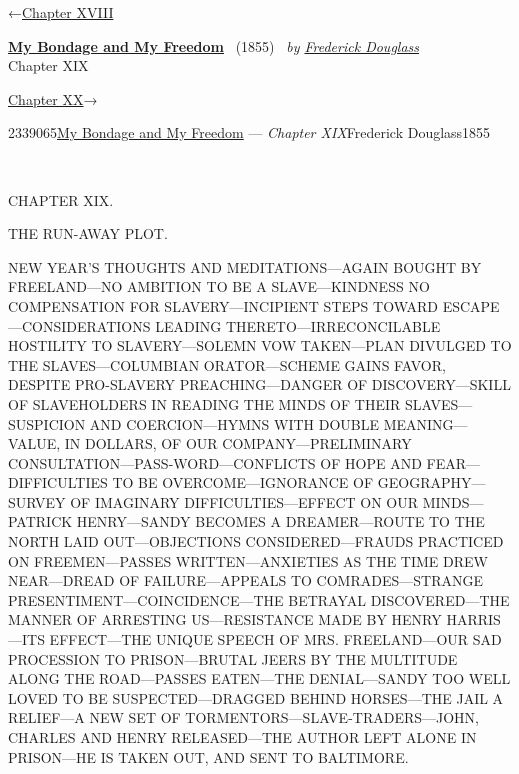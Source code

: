 \hypertarget{headerContainer}{}
\hypertarget{navigationHeader}{}
\protect\hypertarget{headerprevious}{}{←\href{/wiki/My_Bondage_and_My_Freedom_(1855)/Chapter_XVIII}{Chapter
XVIII}}

\textbf{\protect\hypertarget{header_title_text}{}{\href{/wiki/My_Bondage_and_My_Freedom_(1855)}{My
Bondage and My Freedom}}} ~(1855)~ \emph{by
\href{/wiki/Author:Frederick_Douglass}{\protect\hypertarget{header_author_text}{}{{Frederick
Douglass}}}}\\
\protect\hypertarget{header_section_text}{}{Chapter XIX}

\protect\hypertarget{headernext}{}{\href{/wiki/My_Bondage_and_My_Freedom_(1855)/Chapter_XX}{Chapter
XX}→}

\hypertarget{navigationNotes}{}

\hypertarget{ws-data}{}
\protect\hypertarget{ws-article-id}{}{2339065}\protect\hypertarget{ws-title}{}{\href{/wiki/My_Bondage_and_My_Freedom_(1855)}{My
Bondage and My Freedom} --- \emph{Chapter
XIX}}\protect\hypertarget{ws-author}{}{Frederick
Douglass}\protect\hypertarget{ws-year}{}{1855}

{\protect\hypertarget{271}{}{}}

~

{CHAPTER XIX.}

THE RUN-AWAY PLOT.

{NEW YEAR'S THOUGHTS AND MEDITATIONS---AGAIN BOUGHT BY FREELAND---NO
AMBITION TO BE A SLAVE---KINDNESS NO COMPENSATION FOR
SLAVERY---INCIPIENT STEPS TOWARD ESCAPE---CONSIDERATIONS LEADING
THERETO---IRRECONCILABLE HOSTILITY TO SLAVERY---SOLEMN VOW TAKEN---PLAN
DIVULGED TO THE SLAVES---COLUMBIAN ORATOR---SCHEME GAINS FAVOR, DESPITE
PRO-SLAVERY PREACHING---DANGER OF DISCOVERY---SKILL OF SLAVEHOLDERS IN
READING THE MINDS OF THEIR SLAVES---SUSPICION AND COERCION---HYMNS WITH
DOUBLE MEANING---VALUE, IN DOLLARS, OF OUR COMPANY---PRELIMINARY
CONSULTATION---PASS-WORD---CONFLICTS OF HOPE AND FEAR---DIFFICULTIES TO
BE OVERCOME---IGNORANCE OF GEOGRAPHY---SURVEY OF IMAGINARY
DIFFICULTIES---EFFECT ON OUR MINDS---PATRICK HENRY---SANDY BECOMES A
DREAMER---ROUTE TO THE NORTH LAID OUT---OBJECTIONS CONSIDERED---FRAUDS
PRACTICED ON FREEMEN---PASSES WRITTEN---ANXIETIES AS THE TIME DREW
NEAR---DREAD OF FAILURE---APPEALS TO COMRADES---STRANGE
PRESENTIMENT---COINCIDENCE---THE BETRAYAL DISCOVERED---THE MANNER OF
ARRESTING US---RESISTANCE MADE BY HENRY HARRIS---ITS EFFECT---THE UNIQUE
SPEECH OF MRS. FREELAND---OUR SAD PROCESSION TO PRISON---BRUTAL JEERS BY
THE MULTITUDE ALONG THE ROAD---PASSES EATEN---THE DENIAL---SANDY TOO
WELL LOVED TO BE SUSPECTED---DRAGGED BEHIND HORSES---THE JAIL A
RELIEF---A NEW SET OF TORMENTORS---SLAVE-TRADERS---JOHN, CHARLES AND
HENRY RELEASED---THE AUTHOR LEFT ALONE IN PRISON---HE IS TAKEN OUT, AND
SENT TO BALTIMORE.}

